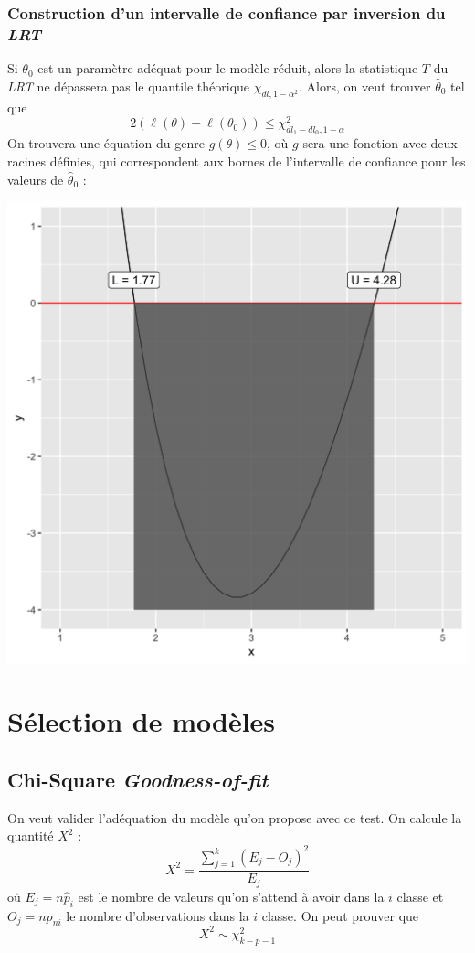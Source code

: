 \documentclass[french, landscape]{article}
\begin{document}
\begin{multicols*}{3}
\subsubsection*{Construction d'un intervalle de confiance par inversion du \emph{LRT}}
Si $\theta_0$ est un paramètre adéquat pour le modèle réduit, alors la statistique $T$ du \emph{LRT} ne dépassera pas le quantile théorique $\chi_{dl, 1- \alpha^2}$. Alors, on veut trouver $\hat{\theta}_0$ tel que
\[2 \left( \ell(\theta) - \ell(\theta_0) \right) \leq  \chi_{dl_1 - dl_0, 1-\alpha}^2\]
On trouvera une équation du genre $g(\theta) \leq 0$, où $g$ sera une fonction avec deux racines définies, qui correspondent aux bornes de l'intervalle de confiance pour les valeurs de $\hat{\theta}_0$ : 
\begin{center}
\includegraphics[scale=0.07]{src/Q13-57_visualisation.png}
\end{center}

\section{Sélection de modèles}
\subsection*{Chi-Square \emph{Goodness-of-fit}}
On veut valider l'adéquation du modèle qu'on propose avec ce test. On calcule la quantité $X^2$ : 
\[X^2 = \frac{\sum_{j=1}^{k}(E_j - O_j)^2 }{E_j}\]
où $E_j = n \hat{p}_i$ est le nombre de valeurs qu'on s'attend à avoir dans la $i$ classe et $O_j = n p_{ni}$ le nombre d'observations dans la $i$ classe. On peut prouver que
\[X^2 \sim \chi_{k-p-1}^2\] \\


\end{multicols*}
\end{document}
